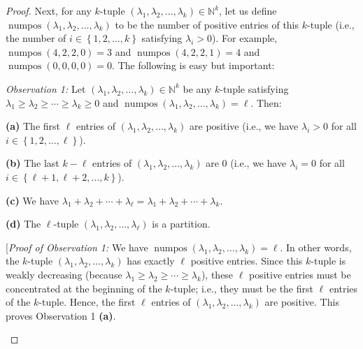\begin{proof}
Next, for any $k$-tuple $\left(  \lambda_{1},\lambda_{2},\ldots,\lambda
_{k}\right)  \in\mathbb{N}^{k}$, let us define $\operatorname*{numpos}\left(
\lambda_{1},\lambda_{2},\ldots,\lambda_{k}\right)  $ to be the number of
positive entries of this $k$-tuple (i.e., the number of $i\in\left\{
1,2,\ldots,k\right\}  $ satisfying $\lambda_{i}>0$). For example,
$\operatorname*{numpos}\left(  4,2,2,0\right)  =3$ and \newline%
$\operatorname*{numpos}\left(  4,2,2,1\right)  =4$ and $\operatorname*{numpos}%
\left(  0,0,0,0\right)  =0$. The following is easy but important:

\begin{statement}
\textit{Observation 1:} Let $\left(  \lambda_{1},\lambda_{2},\ldots
,\lambda_{k}\right)  \in\mathbb{N}^{k}$ be any $k$-tuple satisfying
$\lambda_{1}\geq\lambda_{2}\geq\cdots\geq\lambda_{k}\geq0$ and
$\operatorname*{numpos}\left(  \lambda_{1},\lambda_{2},\ldots,\lambda
_{k}\right)  =\ell$. Then:

\textbf{(a)} The first $\ell$ entries of $\left(  \lambda_{1},\lambda
_{2},\ldots,\lambda_{k}\right)  $ are positive (i.e., we have $\lambda_{i}>0$
for all $i\in\left\{  1,2,\ldots,\ell\right\}  $).

\textbf{(b)} The last $k-\ell$ entries of $\left(  \lambda_{1},\lambda
_{2},\ldots,\lambda_{k}\right)  $ are $0$ (i.e., we have $\lambda_{i}=0$ for
all $i\in\left\{  \ell+1,\ell+2,\ldots,k\right\}  $).

\textbf{(c)} We have $\lambda_{1}+\lambda_{2}+\cdots+\lambda_{\ell}%
=\lambda_{1}+\lambda_{2}+\cdots+\lambda_{k}$.

\textbf{(d)} The $\ell$-tuple $\left(  \lambda_{1},\lambda_{2},\ldots
,\lambda_{\ell}\right)  $ is a partition.
\end{statement}

\begin{fineprint}
[\textit{Proof of Observation 1:} We have $\operatorname*{numpos}\left(
\lambda_{1},\lambda_{2},\ldots,\lambda_{k}\right)  =\ell$. In other words, the
$k$-tuple $\left(  \lambda_{1},\lambda_{2},\ldots,\lambda_{k}\right)  $ has
exactly $\ell$ positive entries. Since this $k$-tuple is weakly decreasing
(because $\lambda_{1}\geq\lambda_{2}\geq\cdots\geq\lambda_{k}$), these $\ell$
positive entries must be concentrated at the beginning of the $k$-tuple; i.e.,
they must be the first $\ell$ entries of the $k$-tuple. Hence, the first
$\ell$ entries of $\left(  \lambda_{1},\lambda_{2},\ldots,\lambda_{k}\right)
$ are positive. This proves Observation 1 \textbf{(a)}.


\end{fineprint}
\end{proof}
